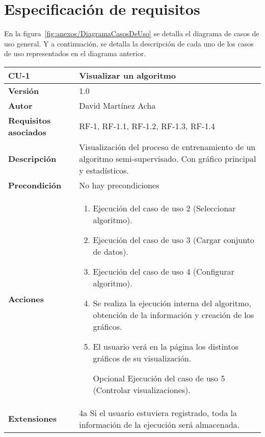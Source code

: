 \section{Especificación de requisitos}


En la figura~\ref{fig:anexos/DiagramaCasosDeUso} se detalla el diagrama de casos
de uso general. Y a continuación, se detalla la descripción de cada uno de los
casos de uso representados en el diagrama anterior.

\begin{table}[p]
	\centering
	\begin{tabularx}{\linewidth}{ p{} p{} }
		\toprule
		\textbf{CU-1}    & \textbf{Visualizar un algoritmo}\\
		\toprule
		\textbf{Versión}              & 1.0    \\
		\textbf{Autor}                & David Martínez Acha \\
		\textbf{Requisitos asociados} & RF-1, RF-1.1, RF-1.2, RF-1.3, RF-1.4 \\
		\textbf{Descripción}          & Visualización del proceso de entrenamiento de un algoritmo semi-supervisado. Con gráfico principal y estadísticos. \\
		\textbf{Precondición}         & No hay precondiciones \\
		\textbf{Acciones}             &
		\begin{enumerate}
			\def\labelenumi{\arabic{enumi}.}
			\tightlist
			\item Ejecución del caso de uso 2 (Seleccionar algoritmo).
			\item Ejecución del caso de uso 3 (Cargar conjunto de datos).
            \item Ejecución del caso de uso 4 (Configurar algoritmo).
			\item Se realiza la ejecución interna del algoritmo, obtención de la información y creación de los gráficos.
            \item El usuario verá en la página los distintos gráficos de su visualización. 
            \item [Opcional] Ejecución del caso de uso 5 (Controlar visualizaciones).
		\end{enumerate}\\
		\textbf{Extensiones}          & 4a Si el usuario estuviera registrado, toda la información de la ejecución será almacenada. \\

\end{tabularx}
\end{table}
